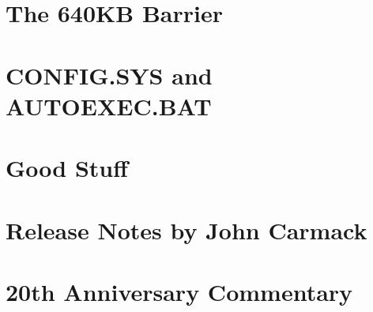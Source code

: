 \documentclass[8pt]{book}
\begin{document}
    \chapter{The 640KB Barrier}\label{chap:barrier640}
        
    \chapter{CONFIG.SYS and AUTOEXEC.BAT}
         
    \chapter{Good Stuff}
          
    \chapter{Release Notes by John Carmack}
        
    \chapter{20th Anniversary Commentary}
        

    
    \cleartoleftpage %
    
    \blankpage
    \blankpage
\end{document}
